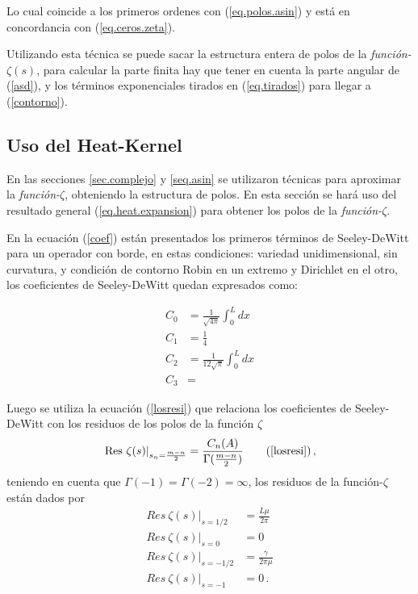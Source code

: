 Lo cual coincide a los primeros ordenes con (\ref{eq.polos.asin}) y está en concordancia  con (\ref{eq.ceros.zeta}).

Utilizando esta técnica se puede sacar la estructura entera de polos de la {\it función-$\zeta (s)$}, para calcular la parte finita hay que tener en cuenta la parte angular de (\ref{asd}), y los términos exponenciales tirados en (\ref{eq.tirados}) para llegar a (\ref{contorno}).


\subsection{Uso del Heat-Kernel}

En las secciones \ref{sec.complejo} y \ref{seq.asin} se utilizaron técnicas para aproximar la {\it función-$\zeta$}, obteniendo la estructura de polos. En esta sección se hará uso del resultado general (\ref{eq.heat.expansion}) para obtener los polos de la {\it función-$\zeta$}.

En la ecuación (\ref{coef}) están presentados los primeros términos de Seeley-DeWitt para un operador con borde, en estas condiciones: variedad unidimensional, sin curvatura, y condición de contorno Robin en un extremo y Dirichlet en el otro, los coeficientes de Seeley-DeWitt quedan expresados como:


\begin{equation}
\begin{aligned}
C _0 &= \frac{1}{\sqrt{4 \pi}} \int _0 ^L dx\\
C _1 &= \frac{1}{4}  \\
C _2 &= \frac{1}{12 \sqrt{\pi}  } \int _0 ^L dx \\
C _3 &=
\end{aligned}
\end{equation}


Luego se utiliza la ecuación (\ref{losresi}) que relaciona los coeficientes de Seeley-DeWitt con los residuos de los polos de la función $\zeta$
\begin{equation}
\left. {\rm Res} \ \zeta  (s)  \right| _{s_n= \frac{m - n}{2}} =  
\frac{ C_n  (A) }{ {\Gamma ( \frac{m-n}{2}} ) }
\tag{\ref{losresi}}
\, ,
\end{equation}
teniendo en cuenta que $\Gamma (-1) = \Gamma (-2) = \infty$, los residuos de la función-$\zeta$ están dados por
\begin{equation}
\begin{aligned}
Res \  \zeta  (s)  | _{s=1/2} &= \frac{L \mu}{2 \pi} \\[5pt]
Res \  \zeta  (s)  | _{s=0} &= 0 \\[5pt]
Res \ \zeta (s) | _{s=-1/2} &= \frac{\gamma}{2 \pi \mu} \\[5pt]
Res \  \zeta  (s) | _{s=-1} &= 0 \, . \\[5pt]
\end{aligned}
\end{equation}


